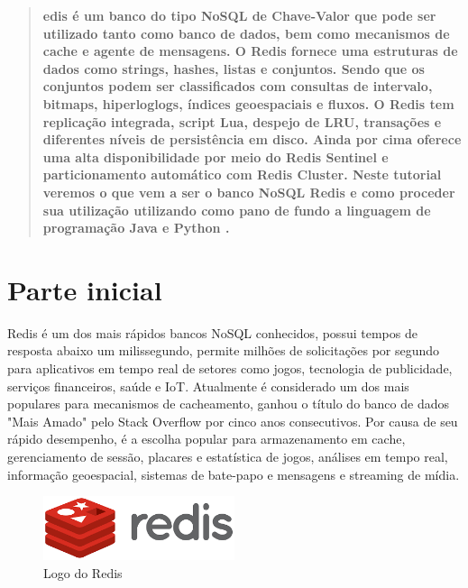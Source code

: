 \documentclass[a4paper,11pt]{article}
\begin{document}
	
\maketitle %
\thispagestyle{fancy} %

	
\begin{abstract}
	\textbf{edis é um banco do tipo NoSQL de Chave-Valor que pode ser utilizado tanto como banco de dados, bem como mecanismos de cache e agente de mensagens. O Redis fornece uma estruturas de dados como strings, hashes, listas e conjuntos. Sendo que os conjuntos podem ser classificados com consultas de intervalo, bitmaps, hiperloglogs, índices geoespaciais e fluxos. O Redis tem replicação integrada, script Lua, despejo de LRU, transações e diferentes níveis de persistência em disco. Ainda por cima oferece uma alta disponibilidade por meio do Redis Sentinel e particionamento automático com Redis Cluster. Neste tutorial veremos o que vem a ser o banco NoSQL Redis \cite{redisoficial} e como proceder sua utilização utilizando como pano de fundo a linguagem de programação Java \cite{javaoficial} e Python \cite{pythonoficial}.}
\end{abstract}


\section{Parte inicial}
Redis é um dos mais rápidos bancos NoSQL conhecidos, possui tempos de resposta abaixo um milissegundo, permite milhões de solicitações por segundo para aplicativos em tempo real de setores como jogos, tecnologia de publicidade, serviços financeiros, saúde e IoT. Atualmente é considerado um dos mais populares para mecanismos de cacheamento, ganhou o título do banco de dados "Mais Amado" pelo Stack Overflow por cinco anos consecutivos. Por causa de seu rápido desempenho, é a escolha popular para armazenamento em cache, gerenciamento de sessão, placares e estatística de jogos, análises em tempo real, informação geoespacial, sistemas de bate-papo e mensagens e streaming de mídia.
\begin{figure}[H]
	\centering
	\includegraphics[width=0.5\textwidth]{imagens/redislogo}
	\caption{Logo do Redis}
\end{figure}
\end{document}
